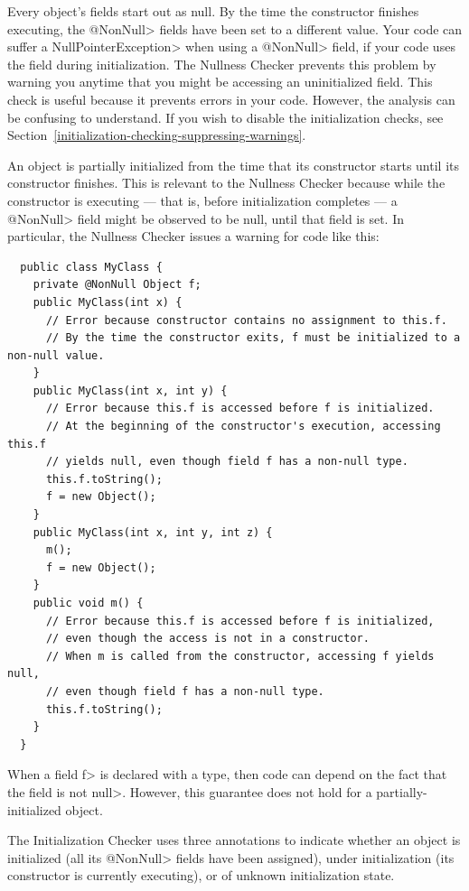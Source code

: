Every object's fields start out as null.  By the time the constructor
finishes executing, the \<@NonNull> fields have been set to a different
value.  Your code can suffer a \<NullPointerException> when using a
\<@NonNull> field, if your code uses the field during initialization.
The Nullness Checker prevents this problem by warning you anytime that you
might be accessing an uninitialized field.  This check is useful because it
prevents errors in your code.  However, the analysis can be confusing to
understand.  If you wish to disable the initialization checks, see
Section~\ref{initialization-checking-suppressing-warnings}.


An object is partially initialized from the time that its constructor starts until its constructor
finishes.  This is relevant to the Nullness Checker because while the
constructor is executing --- that is, before initialization completes ---
a \<@NonNull>
field might be observed to be null, until that field is set.  In
particular, the Nullness Checker issues a warning for code like this:

\begin{Verbatim}
  public class MyClass {
    private @NonNull Object f;
    public MyClass(int x) {
      // Error because constructor contains no assignment to this.f.
      // By the time the constructor exits, f must be initialized to a non-null value.
    }
    public MyClass(int x, int y) {
      // Error because this.f is accessed before f is initialized.
      // At the beginning of the constructor's execution, accessing this.f
      // yields null, even though field f has a non-null type.
      this.f.toString();
      f = new Object();
    }
    public MyClass(int x, int y, int z) {
      m();
      f = new Object();
    }
    public void m() {
      // Error because this.f is accessed before f is initialized,
      // even though the access is not in a constructor.
      // When m is called from the constructor, accessing f yields null,
      // even though field f has a non-null type.
      this.f.toString();
    }
  }
\end{Verbatim}

\noindent
When a field \<f> is declared with a 
type, then code can depend on the fact that the field is not \<null>.
However, this guarantee does not hold for a partially-initialized object.

The Initialization Checker uses three annotations to indicate whether an object
is initialized (all its \<@NonNull> fields have been assigned), under
initialization (its constructor is currently executing), or of unknown
initialization state.

